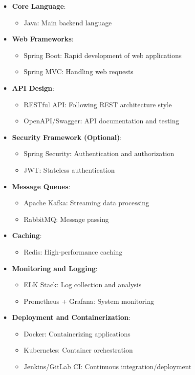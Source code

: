 \documentclass[a4paper,12pt]{article}
\begin{document}
\begin{itemize}
  \item \textbf{Core Language}:
    \begin{itemize}
      \item Java: Main backend language
    \end{itemize}
  
  \item \textbf{Web Frameworks}:
    \begin{itemize}
      \item Spring Boot: Rapid development of web applications
      \item Spring MVC: Handling web requests
    \end{itemize}
  
  \item \textbf{API Design}:
    \begin{itemize}
      \item RESTful API: Following REST architecture style
      \item OpenAPI/Swagger: API documentation and testing
    \end{itemize}
  
  \item \textbf{Security Framework (Optional)}:
    \begin{itemize}
      \item Spring Security: Authentication and authorization
      \item JWT: Stateless authentication
    \end{itemize}
  
  \item \textbf{Message Queues}:
    \begin{itemize}
      \item Apache Kafka: Streaming data processing
      \item RabbitMQ: Message passing
    \end{itemize}
  
  \item \textbf{Caching}:
    \begin{itemize}
      \item Redis: High-performance caching
    \end{itemize}
  
  \item \textbf{Monitoring and Logging}:
    \begin{itemize}
      \item ELK Stack: Log collection and analysis
      \item Prometheus + Grafana: System monitoring
    \end{itemize}
  
  \item \textbf{Deployment and Containerization}:
    \begin{itemize}
      \item Docker: Containerizing applications
      \item Kubernetes: Container orchestration
      \item Jenkins/GitLab CI: Continuous integration/deployment
    \end{itemize}
\end{itemize}
\end{document}
